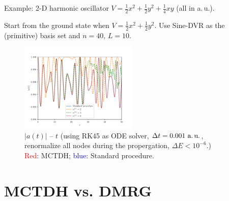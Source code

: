 \documentclass[12pt]{beamer}
\begin{document}
    \begin{frame}{Example: 2-D harmonic oscillator}
        \footnotesize
        $V = \frac{1}{2}x^2 + \frac{1}{2}y^2 + \frac{1}{4}xy$ (all in a.\,u.).
        
        Start from the ground state when $V = \frac{1}{2}x^2 + \frac{1}{2}y^2$. Use Sine-DVR as the (primitive) basis set and $n=40$, $L=10$.
        \begin{figure}
            \includegraphics[width=0.5\textwidth]{autocorr_MCTDH.pdf}
            \caption{$|a(t)|$ -- $t$ (using RK45 as ODE solver, $\Delta t = 0.001~\text{a.\,u.}$, renormalize all nodes during the propergation, $\Delta E < 10^{-6}$.)\\
            \footnotesize\textcolor{red}{Red}: MCTDH; \textcolor{blue}{blue}: Standard procedure.}
        \end{figure}
    \end{frame}


    \section{MCTDH vs. DMRG}
\end{document}
